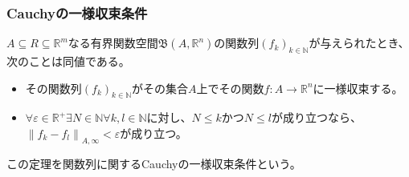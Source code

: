 \documentclass[dvipdfmx]{jsarticle}
\begin{document}
\subsubsection{Cauchyの一様収束条件}%
\begin{thm}[関数列に関するCauchyの一様収束条件]\label{4.1.11.14}
$A \subseteq R \subseteq \mathbb{R}^{m}$なる有界関数空間$\mathfrak{B}\left( A,\mathbb{R}^{n} \right)$の関数列$\left( f_{k} \right)_{k \in \mathbb{N}}$が与えられたとき、次のことは同値である。
\begin{itemize}
\item
  その関数列$\left( f_{k} \right)_{k \in \mathbb{N}}$がその集合$A$上でその関数$f:A \rightarrow \mathbb{R}^{n}$に一様収束する。
\item
  $\forall\varepsilon \in \mathbb{R}^{+}\exists N \in \mathbb{N}\forall k,l \in \mathbb{N}$に対し、$N \leq k$かつ$N \leq l$が成り立つなら、$\left\| f_{k} - f_{l} \right\|_{A,\infty} < \varepsilon$が成り立つ。
\end{itemize}
この定理を関数列に関するCauchyの一様収束条件という。
\end{thm}
\end{document}
